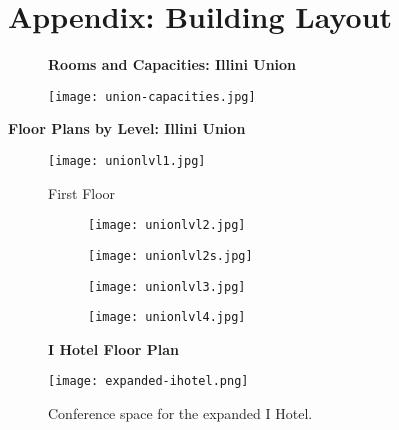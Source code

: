 \section{Appendix: Building Layout}

\begin{figure}[H]
	\centering
	\textbf{Rooms and Capacities: Illini Union} \par\medskip
	\texttt{[image: union-capacities.jpg]}
\end{figure}

\newpage
{\centering\textbf{Floor Plans by Level: Illini Union} \par\medskip}
\begin{figure}[H]
	\centering
	\texttt{[image: unionlvl1.jpg]}
	\caption{First Floor}
\end{figure}

\begin{figure}[H]
	\centering
	\begin{subfigure}{0.5\textwidth}
		\centering
		\texttt{[image: unionlvl2.jpg]}
	\end{subfigure}%
	\begin{subfigure}{0.5\textwidth}
		\centering
		\texttt{[image: unionlvl2s.jpg]}
	\end{subfigure}
	\begin{subfigure}{0.5\textwidth}
		\centering
		\texttt{[image: unionlvl3.jpg]}
	\end{subfigure}%
	\begin{subfigure}{0.5\textwidth}
		\centering
		\texttt{[image: unionlvl4.jpg]}
	\end{subfigure}		
\end{figure}

\vspace{1cm}
\begin{figure}[H]
	\centering
	\textbf{I Hotel Floor Plan} \par\medskip
	\texttt{[image: expanded-ihotel.png]}
	\caption{Conference space for the expanded I Hotel.}
\end{figure}

